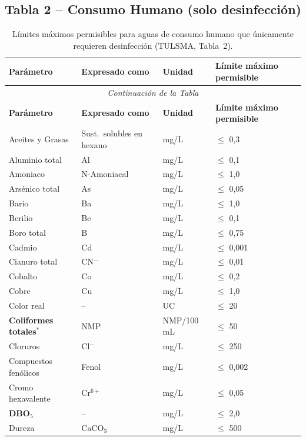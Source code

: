 \documentclass[12pt,a4paper]{article}
\begin{document}
\subsection{Tabla 2 -- Consumo Humano (solo desinfecci\'on)}

\small
\begin{longtable}{p{4.5cm}p{2.0cm}p{2.0cm}p{3.5cm}}
\caption{L\'imites m\'aximos permisibles para aguas de consumo humano que \'unicamente requieren desinfecci\'on (TULSMA, Tabla~2).}\\
\toprule
\textbf{Par\'ametro} & \textbf{Expresado como} & \textbf{Unidad} & \textbf{L\'imite m\'aximo permisible} \\
\midrule
\endfirsthead
\multicolumn{4}{c}{\small\itshape Continuaci\'on de la Tabla}\\
\toprule
\textbf{Par\'ametro} & \textbf{Expresado como} & \textbf{Unidad} & \textbf{L\'imite m\'aximo permisible} \\
\midrule
\endhead
\bottomrule
\endlastfoot
Aceites y Grasas & Sust.\ solubles en hexano & mg/L & $\leq$ 0,3 \\
Aluminio total & Al & mg/L & $\leq$ 0,1 \\
Amoniaco & N-Amoniacal & mg/L & $\leq$ 1,0 \\
Ars\'enico total & As & mg/L & $\leq$ 0,05 \\
Bario & Ba & mg/L & $\leq$ 1,0 \\
Berilio & Be & mg/L & $\leq$ 0,1 \\
Boro total & B & mg/L & $\leq$ 0,75 \\
Cadmio & Cd & mg/L & $\leq$ 0,001 \\
Cianuro total & CN$^-$ & mg/L & $\leq$ 0,01 \\
Cobalto & Co & mg/L & $\leq$ 0,2 \\
Cobre & Cu & mg/L & $\leq$ 1,0 \\
Color real & -- & UC & $\leq$ 20 \\
\textbf{Coliformes totales}$^*$ & NMP & NMP/100 mL & $\leq$ 50 \\
Cloruros & Cl$^-$ & mg/L & $\leq$ 250 \\
Compuestos fen\'olicos & Fenol & mg/L & $\leq$ 0,002 \\
Cromo hexavalente & Cr$^{6+}$ & mg/L & $\leq$ 0,05 \\
\textbf{DBO$_5$} & -- & mg/L & $\leq$ 2,0 \\
Dureza & CaCO$_3$ & mg/L & $\leq$ 500 \\

\end{longtable}
\end{document}

